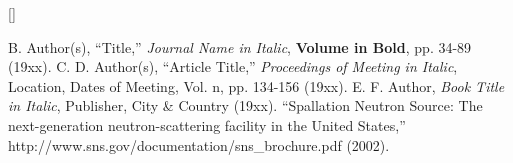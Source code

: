 \documentclass{mc2013}
\begin{document}

[]


\setlength{\baselineskip}{12pt}
\begin{thebibliography}{300}
 B. Author(s), ``Title,'' {\it Journal Name in Italic}, 
          {\bf Volume in Bold}, pp. 34-89 (19xx).
 C. D. Author(s), ``Article Title,'' {\it Proceedings of
          Meeting in Italic}, Location, Dates of Meeting, Vol. n, pp. 134-156 
          (19xx).
 E. F. Author, {\it Book Title in Italic}, Publisher, City \&
          Country (19xx). 
 ``Spallation Neutron Source: The next-generation 
          neutron-scattering facility in the United States,'' 
          http://www.sns.gov/documentation/sns\_brochure.pdf (2002).
\end{thebibliography}
\end{document}
